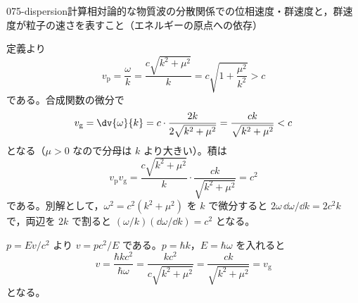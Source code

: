 \documentclass[uplatex,dvipdfmx,a4paper,11pt]{jsarticle}
\begin{document}
\begin{mondai}{075-dispersion}{計算}{相対論的な物質波の分散関係での位相速度・群速度と，群速度が粒子の速さを表すこと（エネルギーの原点への依存）}
\begin{tadashii}
\keisan {} 定義より
\[ v_{\mathrm{p}}=\frac{\omega}{k}=\frac{c\sqrt{k^{2}+\mu^{2}}}{k}=c\sqrt{1+\frac{\mu^{2}}{k^{2}}}>c \]
である。合成関数の微分で
\[ v_{\mathrm{g}}=\dv{\omega}{k}=c\cdot\frac{2k}{2\sqrt{k^{2}+\mu^{2}}}=\frac{ck}{\sqrt{k^{2}+\mu^{2}}}<c \]
となる（$\mu>0$ なので分母は $k$ より大きい）。積は
\[ v_{\mathrm{p}}v_{\mathrm{g}}=\frac{c\sqrt{k^{2}+\mu^{2}}}{k}\cdot\frac{ck}{\sqrt{k^{2}+\mu^{2}}}=c^{2} \]
である。別解として，$\omega^{2}=c^{2}(k^{2}+\mu^{2})$ を $k$ で微分すると $2\omega\,\dd\omega/\dd k=2c^{2}k$ で，両辺を $2k$ で割ると $(\omega/k)(\dd\omega/\dd k)=c^{2}$ となる。

 $p=Ev/c^{2}$ より $v=pc^{2}/E$ である。$p=\hbar k$，$E=\hbar\omega$ を入れると
\[ v=\frac{\hbar kc^{2}}{\hbar\omega}=\frac{kc^{2}}{c\sqrt{k^{2}+\mu^{2}}}=\frac{ck}{\sqrt{k^{2}+\mu^{2}}}=v_{\mathrm{g}} \]
となる。


\end{tadashii}
\end{mondai}
\end{document}
